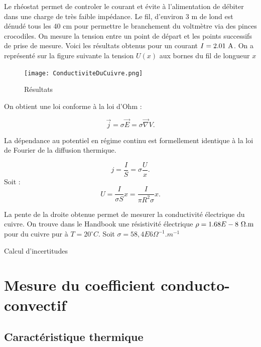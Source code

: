 \documentclass[french]{article}
\begin{document}
Le rhéostat permet de controler le courant et évite à l'alimentation de débiter dans une charge de très faible impédance. Le fil, d'environ 3 m de lond est dénudé tous les 40 cm pour permettre le branchement du voltmètre via des pinces crocodiles. On mesure la tension entre un point de départ et les points successifs de prise de mesure. Voici les résultats obtenus pour un courant $I = 2.01~\rm A$. On a représenté sur la figure suivante la tension $U(x)$ aux bornes du fil de longueur $x$

\begin{figure}
	\centering
	\texttt{[image: ConductiviteDuCuivre.png]}
	\caption{Résultats}
\end{figure}

On obtient une loi conforme à la loi d'Ohm : 

\begin{equation}
	\vec{j}=\sigma\vec{E}=\sigma\vec{\nabla}V.
\end{equation}

La dépendance au potentiel en régime continu est formellement identique à la loi de Fourier de la diffusion thermique.

\begin{equation}
	j = \dfrac{I}{S} = \sigma\dfrac{U}{x}.
\end{equation}
Soit : 
\begin{equation}
	U = \dfrac{I}{\sigma S}x = \dfrac{I}{\pi R^2\sigma}x.
\end{equation}

La pente de la droite obtenue permet de mesurer la conductivité électrique du cuivre. On trouve dans le Handbook une résistivité électrique $\rho=1.68E-8~\rm \Omega . m$ pour du cuivre pur à $T=20^\circ C$. Soit $\sigma = 58,4E6 \Omega^{-1}.m^{-1}$

\begin{ombreremarque}
	\begin{remarque}
		Calcul d'incertitudes
	\end{remarque}
\end{ombreremarque}


\section{Mesure du coefficient conducto-convectif}

\subsection{Caractéristique thermique}
\end{document}
